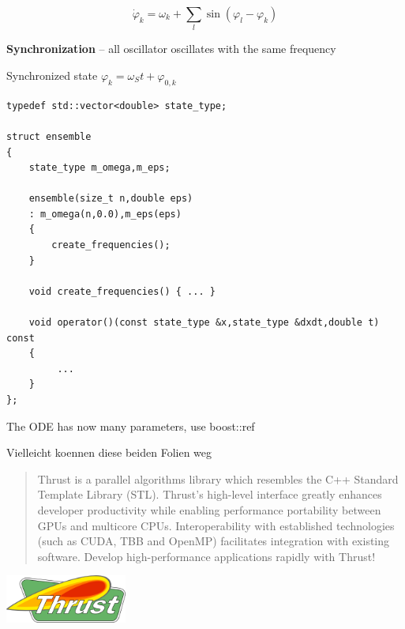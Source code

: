 \begin{frame}[fragile]


 \vspace{2ex}

$$\dot{\varphi}_k = \omega_k + \sum\limits_l \sin( \varphi_l - \varphi_k )$$

{\bf Synchronization} -- all oscillator oscillates with the same frequency

 \vspace{2ex}

Synchronized state $\varphi_k = \omega_S t + \varphi_{0,k} $

\end{frame}



\begin{frame}[fragile]


\begin{lstlisting}
typedef std::vector<double> state_type;

struct ensemble
{
    state_type m_omega,m_eps;

    ensemble(size_t n,double eps)
    : m_omega(n,0.0),m_eps(eps)
    {
        create_frequencies();
    }

    void create_frequencies() { ... }

    void operator()(const state_type &x,state_type &dxdt,double t) const
    {
         ...
    }
};
\end{lstlisting}

The ODE has now many parameters, use boost::ref

Vielleicht koennen diese beiden Folien weg

\end{frame}



\begin{frame}[fragile]


\vspace{4ex}
\begin{quotation}
Thrust is a parallel algorithms library which resembles the C++ Standard Template Library (STL). Thrust's high-level interface greatly enhances developer productivity while enabling performance portability between GPUs and multicore CPUs. Interoperability with established technologies (such as CUDA, TBB and OpenMP) facilitates integration with existing software. Develop high-performance applications rapidly with Thrust!
\end{quotation}

\vspace{2ex}

\centerline{\includegraphics[draft=false,width=0.3\textwidth]{thrust_logo.png}}
 

\end{frame}


